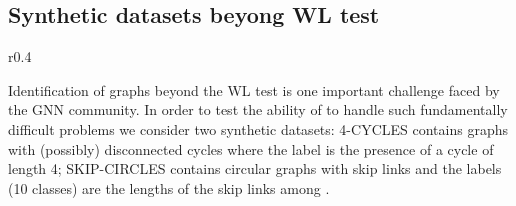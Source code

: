 \documentclass{article}
\begin{document}
\subsection{Synthetic datasets beyong WL test \label{sec:beyondWL}}
\begin{wraptable}{r}{0.4\textwidth} 
	\vspace{-5mm}
	\caption{Average accuracy on synthetic datasets (10 simulations). } \label{tab:toy}
	\begin{center}
	\end{center}
\end{wraptable}

Identification of graphs beyond the WL test is one important
challenge faced by the GNN community. In order to test the ability of  to handle
such fundamentally difficult problems we consider two synthetic datasets:
4-CYCLES \cite{loukas2019graph, papp2021dropgnn} contains graphs with
(possibly) disconnected cycles where the label  is the presence of a cycle of
length 4; SKIP-CIRCLES \cite{chen2019equivalence} contains circular graphs with
skip links and the labels (10 classes) are the lengths of the skip links among . 
\end{document}
